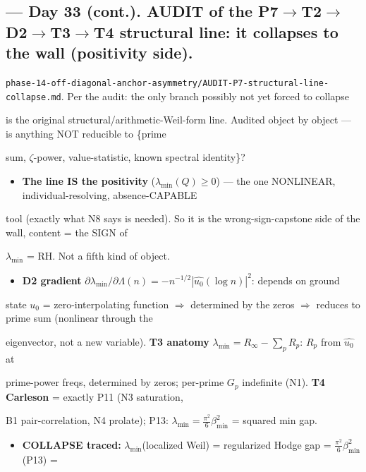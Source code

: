 \documentclass[10pt]{article}
\begin{document}
\subsection*{ --- Day 33 (cont.). AUDIT of the P7\ensuremath{\to}T2\ensuremath{\to}D2\ensuremath{\to}T3\ensuremath{\to}T4 structural line: it collapses to the wall (positivity side).}
\texttt{phase-14-off-diagonal-anchor-asymmetry/AUDIT-P7-structural-line-collapse.md}. Per the audit: the only branch possibly not yet forced to collapse\par
is the original structural/arithmetic-Weil-form line. Audited object by object --- is anything NOT reducible to \{prime\par
sum, \ensuremath{\zeta}-power, value-statistic, known spectral identity\}?\par
\begin{itemize}
\item \textbf{The line IS the positivity} ($\lambda_{\min}(Q)\ge0$) --- the one NONLINEAR, individual-resolving, absence-CAPABLE
\end{itemize}
  tool (exactly what N8 says is needed). So it is the wrong-sign-capstone side of the wall, content = the SIGN of\par
  $\lambda_{\min}$ = RH. Not a fifth kind of object.\par
\begin{itemize}
\item \textbf{D2 gradient} $\partial\lambda_{\min}/\partial\Lambda(n)=-n^{-1/2}|\widehat{u_0}(\log n)|^2$: depends on ground
\end{itemize}
  state $u_0$ = zero-interpolating function \ensuremath{\Rightarrow} determined by the zeros \ensuremath{\Rightarrow} reduces to prime sum (nonlinear through the\par
  eigenvector, not a new variable). \textbf{T3 anatomy} $\lambda_{\min}=R_\infty-\sum_pR_p$: $R_p$ from $\widehat{u_0}$ at\par
  prime-power freqs, determined by zeros; per-prime $G_p$ indefinite (N1). \textbf{T4 Carleson} = exactly P11 (N3 saturation,\par
  B1 pair-correlation, N4 prolate); P13: $\lambda_{\min}=\tfrac{\pi^2}6\beta_{\min}^2$ = squared min gap.\par
\begin{itemize}
\item \textbf{COLLAPSE traced:} $\lambda_{\min}$(localized Weil) = regularized Hodge gap = $\tfrac{\pi^2}6\beta_{\min}^2$ (P13) =
\end{itemize}
\end{document}
